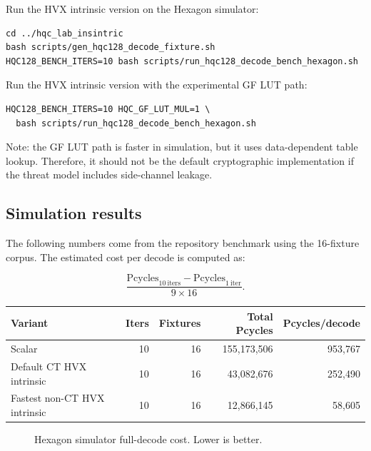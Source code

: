 \documentclass[12pt,a4paper]{article}
\begin{document}
Run the HVX intrinsic version on the Hexagon simulator:

\begin{lstlisting}[style=bashstyle]
cd ../hqc_lab_insintric
bash scripts/gen_hqc128_decode_fixture.sh
HQC128_BENCH_ITERS=10 bash scripts/run_hqc128_decode_bench_hexagon.sh
\end{lstlisting}

Run the HVX intrinsic version with the experimental GF LUT path:

\begin{lstlisting}[style=bashstyle]
HQC128_BENCH_ITERS=10 HQC_GF_LUT_MUL=1 \
  bash scripts/run_hqc128_decode_bench_hexagon.sh
\end{lstlisting}

Note: the GF LUT path is faster in simulation, but it uses data-dependent table lookup. Therefore, it should not be the default cryptographic implementation if the threat model includes side-channel leakage.

\subsection{Simulation results}

The following numbers come from the repository benchmark using the 16-fixture corpus. The estimated cost per decode is computed as:

\[
\frac{\text{Pcycles}_{10\ \text{iters}} - \text{Pcycles}_{1\ \text{iter}}}{9 \times 16}.
\]

\begin{center}
\begin{tabular}{lrrrr}
\toprule
Variant & Iters & Fixtures & Total Pcycles & Pcycles/decode \\
\midrule
Scalar & 10 & 16 & 155,173,506 & 953,767 \\
Default CT HVX intrinsic & 10 & 16 & 43,082,676 & 252,490 \\
Fastest non-CT HVX intrinsic & 10 & 16 & 12,866,145 & 58,605 \\
\bottomrule
\end{tabular}
\end{center}

\begin{figure}[htbp]
\centering
{}
\caption{Hexagon simulator full-decode cost. Lower is better.}
\end{figure}
\end{document}
